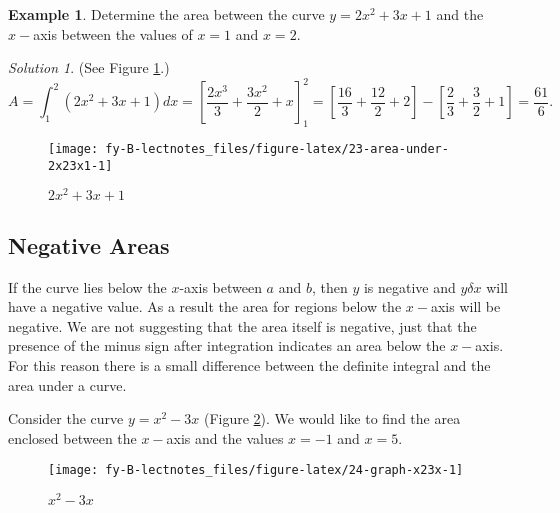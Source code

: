 \documentclass[
  11pt,
  oneside]{book}
\newcommand{\slide}{}
\theoremstyle{definition}
\theoremstyle{definition}
\newtheorem{example}{Example}[chapter]
\theoremstyle{definition}
\theoremstyle{definition}
\theoremstyle{remark}
\newtheorem*{solution}{Solution}
\begin{document}
\begin{example}
Determine the area between the curve \(y=2x^2+3x+1\) and the \(x-\)axis between the values of \(x=1\) and \(x=2\).
\end{example}

\begin{solution}
\leavevmode

(See Figure \ref{fig:23-area-under-2x23x1}.)
\[
A=\int_1^2(2x^2+3x+1)dx = \left[\frac{2x^3}{3}+\frac{3x^2}{2}+x\right]_1^2 = \left[\frac{16}{3}+\frac{12}{2}+2\right]-\left[\frac{2}{3}+\frac 32 + 1\right] = \frac{61}{6}.
\]

\begin{figure}

{\centering \texttt{[image: fy-B-lectnotes\_files/figure-latex/23-area-under-2x23x1-1]} 

}

\caption{$2x^2+3x+1$}\label{fig:23-area-under-2x23x1}
\end{figure}

\end{solution}

\slide

\subsection{Negative Areas}\label{negative-areas}

If the curve lies below the \(x\)-axis between \(a\) and \(b\), then \(y\) is negative and \(y\delta x\) will have a negative value. As a result the area for regions below the \(x-\)axis will be negative. We are not suggesting that the area itself is negative, just that the presence of the minus sign after integration indicates an area below the \(x-\)axis. For this reason there is a small difference between the definite integral and the area under a curve.

Consider the curve \(y = x^2 - 3x\) (Figure \ref{fig:24-graph-x23x}). We would like to find the area enclosed between the \(x-\)axis and the values \(x = -1\) and \(x = 5\).

\begin{figure}

{\centering \texttt{[image: fy-B-lectnotes\_files/figure-latex/24-graph-x23x-1]} 

}

\caption{$x^2-3x$}\label{fig:24-graph-x23x}
\end{figure}
\end{document}
